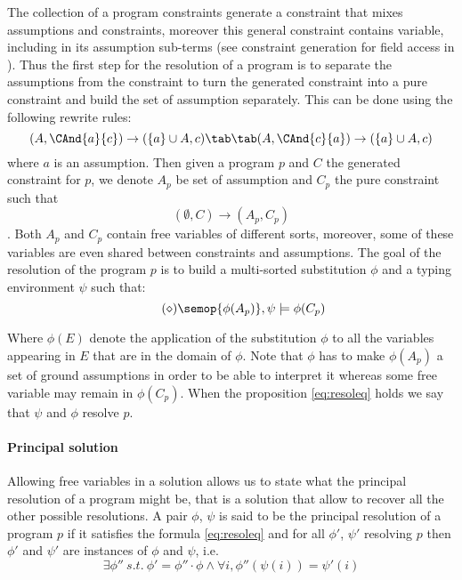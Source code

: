 The collection of a program constraints generate a constraint that mixes
assumptions and constraints, moreover this general constraint contains variable,
including in its assumption sub-terms (see constraint generation for field
access in ).
Thus the first step for the resolution of a program is to separate the
assumptions from the constraint to turn the generated constraint into a pure
constraint and build the set of assumption separately. This can be done using
the following rewrite rules:
$$ (A, \CAnd{a}{c}) \rightarrow (\{a\}\cup A,c) \tab\tab (A, \CAnd{c}{a})
\rightarrow (\{a\}\cup A,c)$$ where $a$ is an assumption.
Then given a program $p$ and $C$ the generated constraint for $p$, we denote
$A_p$ be set of assumption and $C_p$ the pure constraint such that $$
(\emptyset,C) \rightarrow (A_p,C_p)$$.
Both $A_p$ and $C_p$ contain free variables of different sorts, moreover, some
of these variables are even shared between constraints and assumptions.
The goal of the resolution of the program $p$ is to build a multi-sorted
substitution $\phi$ and a typing environment $\psi$ such that:
\begin{equation}\tag{$\diamond$}
  \label{eq:resoleq}
 \semop{\phi(A_p)},\psi \models \phi(C_p)  
\end{equation}

Where $\phi(E)$ denote the application of the substitution $\phi$ to all the
variables appearing in $E$ that are in the domain of $\phi$.
Note that $\phi$ has to make $\phi(A_p)$ a set of ground assumptions in order to
be able to interpret it whereas some free variable may remain in $\phi(C_p)$.
When the proposition \ref{eq:resoleq} holds we say that $\psi$ and $\phi$
resolve $p$.


\paragraph{Principal solution}
Allowing free variables in a solution allows us to state what the principal resolution of a program might be, that is a solution 
that allow to recover all the other possible resolutions. A pair $\phi$, $\psi$ is said to be the principal resolution of a program $p$ if it satisfies the formula \ref{eq:resoleq} and for all $\phi'$, $\psi'$ resolving $p$ then $\phi'$ and $\psi'$ are instances of $\phi$ and $\psi$, i.e.
$$ \exists \phi''\ s.t.\ \phi' = \phi''\cdot\phi \wedge \forall i, \phi''(\psi(i)) = \psi'(i)$$

